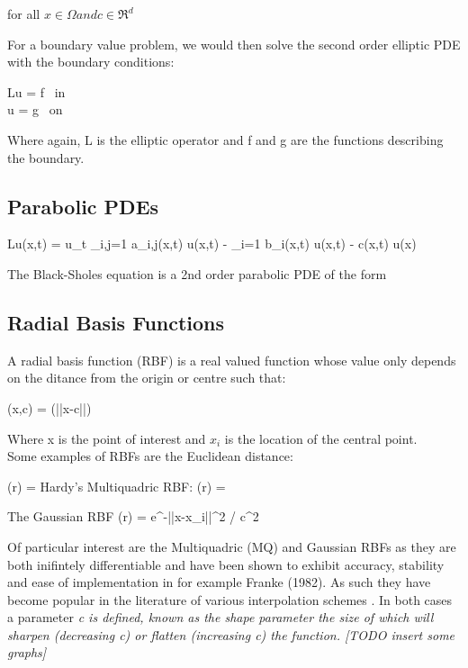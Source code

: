 \documentclass[a4paper]{amsart}
\begin{document}
for all $ x \in \Omega and c \in \Re^{d}$

For a boundary value problem, we would then solve the second order elliptic PDE with the boundary conditions:

\be
Lu = f \mbox{ in } \Omega \\
\label{EPDE1}
\ee
\be
u = g \mbox{ on } \partial \Omega
\label{EPDE2}
\ee

Where again, L is the elliptic operator and f and g are the functions describing the boundary.

\subsection{Parabolic PDEs}


\be
Lu(x,t) = u_{t} \sum_{i,j=1} a_{i,j}(x,t)  u(x,t) - \sum_{i=1} b_{i}(x,t)  u(x,t) - c(x,t) u(x)
\label{PPDE}
\ee

The Black-Sholes equation is a 2nd order parabolic PDE of the form

\subsection{Radial Basis Functions}

A radial basis function (RBF) is a real valued function whose value only depends on the ditance from the origin or centre such that:

\be
\phi(x,c) = \phi(||x-c||)
\ee

Where x is the point of interest and $x_{i}$ is the location of the central point. \\Some examples of RBFs are the Euclidean distance:

\be
\phi(r) = 
\ee
Hardy's Multiquadric RBF:
\be
\phi(r) = 
\ee

The Gaussian RBF
\be
\phi(r) = e^{-||x-x_{i}||^{2} / c^{2}}
\ee


Of particular interest are the Multiquadric (MQ) and Gaussian RBFs as they are both inifintely differentiable and have been shown to exhibit accuracy, stability and ease of implementation in for example Franke (1982)\cite{rbf3}. As such they have become popular in the literature of various interpolation schemes \cite{rbf4}. In both cases a parameter \em{c} is defined, known as the \em{shape parameter} the size of which will sharpen (decreasing c) or flatten (increasing c) the function.
[TODO insert some graphs]
\end{document}
